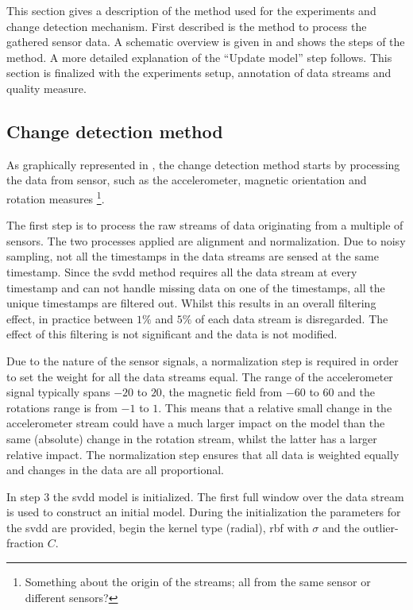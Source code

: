 This section gives a description of the method used for the experiments and change detection mechanism.
First described is the method to process the gathered sensor data.
A schematic overview is given in  and shows the steps of the method.
A more detailed explanation of the ``Update model'' step follows.
This section is finalized with the experiments setup, annotation of data streams and quality measure.

\subsection{Change detection method}
As graphically represented in , the change detection method starts by processing the data from sensor, such as the accelerometer, magnetic orientation and rotation measures \footnote{Something about the origin of the streams; all from the same sensor or different sensors?}.

The first step is to process the raw streams of data originating from a multiple of sensors.
The two processes applied are alignment and normalization.
Due to noisy sampling, not all the timestamps in the data streams are sensed at the same timestamp.
Since the \gls{svdd} method requires all the data stream at every timestamp and can not handle missing data on one of the timestamps, all the unique timestamps are filtered out.
Whilst this results in an overall filtering effect, in practice between $1\%$ and $5\%$ of each data stream is disregarded.
The effect of this filtering is not significant and the data is not modified.

Due to the nature of the sensor signals, a normalization step is required in order to set the weight for all the data streams equal.
The range of the accelerometer signal typically spans $-20$ to $20$, the magnetic field from $-60$ to $60$ and the rotations range is from $-1$ to $1$.
This means that a relative small change in the accelerometer stream could have a much larger impact on the model than the same (absolute) change in the rotation stream, whilst the latter has a larger relative impact.
The normalization step ensures that all data is weighted equally and changes in the data are all proportional.

In step $3$ the \gls{svdd} model is initialized.
The first full window over the data stream is used to construct an initial model.
During the initialization the parameters for the \gls{svdd} are provided, begin the kernel type (radial), \gls{rbf} with $\sigma$ and the outlier-fraction $C$.

